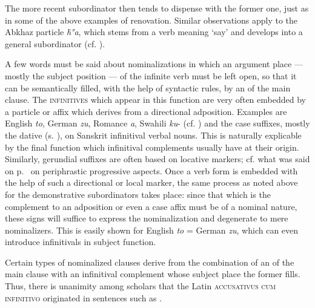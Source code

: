 \noindent The more recent subordinator then tends to dispense with the former one, just as in some of the above examples of renovation. Similar observations apply to the Abkhaz particle \textit{\=h°a}, which stems from a verb meaning ‘say’ and develops into a general subordinator (cf. \citealt[5--8, 28--35, 43]{Hewitt1979}).

A few words must be said about nominalizations in which an argument place — mostly the subject position — of the infinite verb must be left open, so that it can be semantically filled, with the help of syntactic rules, by an \np of the main clause. The \textsc{infinitives} which appear in this function are very often embedded by a particle or affix which derives from a directional adposition. Examples are English \textit{to}, German \textit{zu}, Romance \textit{a}, Swahili \textit{ku}{}- (cf. \citealt{Meinhof1936}) and the case suffixes, mostly the dative (s. \citealt[298]{Szemerényi1970}), on Sanskrit infinitival verbal nouns. This is naturally explicable by the final function which infinitival complements usually have at their origin. Similarly, gerundial suffixes are often based on locative markers; cf. what was said on p.~\pageref{page33}\chk%
on periphrastic progressive aspects. Once a verb form is embedded with the help of such a directional or local marker, the same process as noted above for the demonstrative subordinators takes place: since that which is the complement to an adposition or even a case affix must be of a nominal nature, these signs will suffice to express the nominalization and degenerate to mere nominalizers. This is easily shown for English \textit{to} = German \textit{zu}, which can even introduce infinitivals in subject function.

Certain types of nominalized clauses derive from the combination of an \np of the main clause with an infinitival complement whose subject place the former fills. Thus, there is unanimity among scholars that the Latin \textsc{accusativus cum infinitivo} originated in sentences such as .

